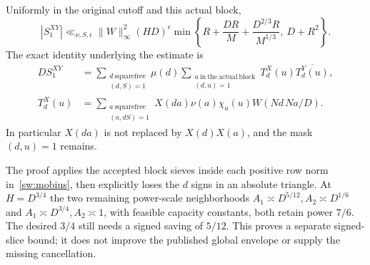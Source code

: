 \begin{proposition}[A bound for the actual signed $h=1$ slice]\label{sw:budget}
Uniformly in the original cutoff and this actual block,
\begin{equation}\label{sw:bound}
 |S_1^{XY}|\ll_{\nu,S,\epsilon}\|W\|_\infty^2(HD)^\epsilon
 \min\left\{R+\frac{DR}{M}+\frac{D^{2/3}R}{M^{1/3}},\ D+R^2\right\}.
\end{equation}
The exact identity underlying the estimate is
\begin{equation}\label{sw:mobius}
 \begin{aligned}
 DS_1^{XY}&=\sum_{\substack{d\ \mathrm{squarefree}\\(d,S)=1}}\mu(d)
 \sum_{\substack{u\ \mathrm{in\ the\ actual\ block}\\(d,u)=1}}
 T_d^X(u)\overline{T_d^Y(u)},\\
 T_d^X(u)&=\sum_{\substack{a\ \mathrm{squarefree}\\(a,dS)=1}}
 X(da)\nu(a)\chi_a(u)W(Nd\,Na/D).
 \end{aligned}
\end{equation}
In particular $X(da)$ is not replaced by $X(d)X(a)$, and the mask
$(d,u)=1$ remains.
\end{proposition}
The proof applies the accepted block sieves inside each positive row norm
in~\eqref{sw:mobius}, then explicitly loses the $d$ signs in an absolute
triangle. At $H=D^{3/4}$ the two remaining power-scale neighborhoods
$A_1\asymp D^{5/12},A_2\asymp D^{1/6}$ and
$A_1\asymp D^{3/4},A_2\asymp1$, with feasible capacity constants, both
retain power $7/6$. The desired $3/4$ still needs a signed saving of
$5/12$. This proves a separate signed-slice bound; it does not improve the
published global envelope or supply the missing cancellation.

